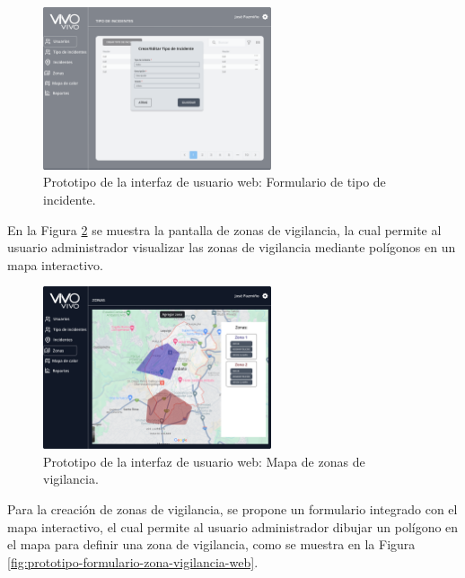 \begin{figure}[H]
    \centering
    \includegraphics[width=0.6\textwidth]{chapters/III-resultados-y-discusion/resources/images/prototipo-formulario-tipo-incidente-web.png}
    \caption{Prototipo de la interfaz de usuario web: Formulario de tipo de incidente.}
    \label{fig:prototipo-formulario-tipo-incidente-web}
\end{figure}

En la Figura \ref{fig:prototipo-mapa-zonas-de-vigilancia-web} se muestra la pantalla de zonas de vigilancia, la cual permite al usuario administrador
visualizar las zonas de vigilancia mediante polígonos en un mapa interactivo.

\begin{figure}[H]
    \centering
    \includegraphics[width=0.6\textwidth]{chapters/III-resultados-y-discusion/resources/images/prototipo-mapa-zonas-de-vigilancia-web.png}
    \caption{Prototipo de la interfaz de usuario web: Mapa de zonas de vigilancia.}
    \label{fig:prototipo-mapa-zonas-de-vigilancia-web}
\end{figure}

Para la creación de zonas de vigilancia, se propone un formulario integrado con el mapa interactivo, el cual permite al usuario administrador
dibujar un polígono en el mapa para definir una zona de vigilancia, como se muestra en la Figura \ref{fig:prototipo-formulario-zona-vigilancia-web}.

